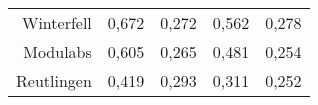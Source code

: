 \begin{table}
\begin{tabular}{rllll}
		Winterfell & {\cellcolor[rgb]{0.635,0.824,0.537}}0,672 & {\cellcolor[rgb]{0.769,0.863,0.561}}0,272 & {\cellcolor[rgb]{0.659,0.831,0.541}}0,562 & {\cellcolor[rgb]{0.741,0.855,0.557}}0,278 \\
		Modulabs & {\cellcolor[rgb]{0.733,0.855,0.557}}0,605 & {\cellcolor[rgb]{0.737,0.855,0.553}}0,265 & {\cellcolor[rgb]{0.769,0.867,0.565}}0,481 & {\cellcolor[rgb]{0.6,0.808,0.525}}0,254 \\
		Reutlingen & {\cellcolor[rgb]{1,0.937,0.612}}0,419 & {\cellcolor[rgb]{0.863,0.894,0.58}}0,293 & {\cellcolor[rgb]{1,0.937,0.612}}0,311 & {\cellcolor[rgb]{0.588,0.808,0.522}}0,252 \\
		\bottomrule
	\end{tabular}
\end{table}
